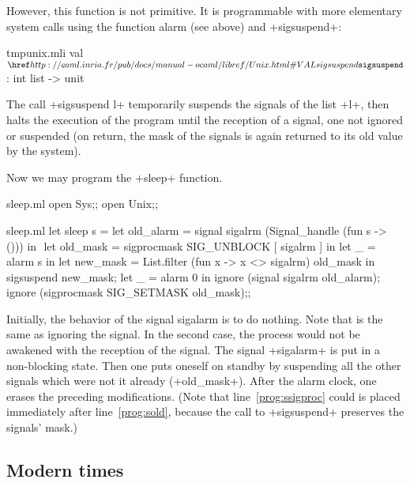 However, this function is not primitive. It is programmable with 
more elementary system calls using the function alarm (see 
above) and \ml+sigsuspend+: 

%
\begin{listingcodefile}{tmpunix.mli}
val $\libvalue{Unix}{sigsuspend}$ : int list -> unit
\end{listingcodefile}
%

The call \ml+sigsuspend l+ temporarily suspends the signals of the 
list \ml+l+, then halts the execution of the program until the reception 
of a signal, one not ignored or suspended (on return, the 
mask of the signals is again returned to its old value by the system).

\begin{example}

Now we may program the \ml+sleep+ function.
%
\begin{codefile}{sleep.ml}
open Sys;;
open Unix;;
\end{codefile}
%
\begin{listingcodefile}[style=numbers]{sleep.ml}
let sleep s = 
  let old_alarm = signal sigalrm (Signal_handle (fun s -> ())) in $\label{prog:sold}$
  let old_mask = sigprocmask SIG_UNBLOCK [ sigalrm ] in
  let _ = alarm s in
  let new_mask = List.filter (fun x -> x <> sigalrm) old_mask in
  sigsuspend new_mask; 
  let _ = alarm 0 in
  ignore (signal sigalrm old_alarm); 
  ignore (sigprocmask SIG_SETMASK old_mask)$\label{prog:ssigproc}$;;
\end{listingcodefile}
%

Initially, the behavior of the signal sigalarm is to do nothing.  Note
that  is the same as ignoring the signal.  In
the second case, the process would not be awakened with the reception
of the signal. The signal \ml+sigalarm+ is put in a non-blocking
state.  Then one puts oneself on standby by suspending all the other
signals which were not it already (\ml+old_mask+). After the alarm
clock, one erases the preceding modifications. (Note that
line~\ref{prog:ssigproc} could is placed immediately after
line~\ref{prog:sold}, because the call to \ml+sigsuspend+ preserves
the signals' mask.)

\end{example}

\subsection*{Modern times}

